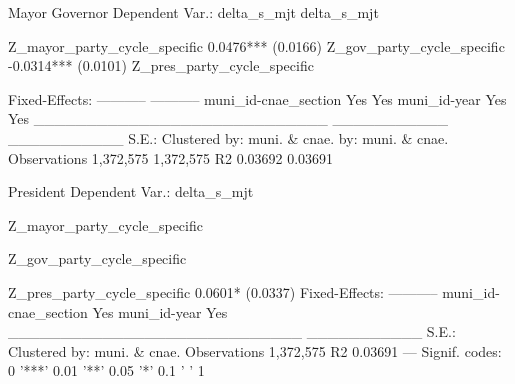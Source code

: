                                          Mayor          Governor
Dependent Var.:                    delta_s_mjt       delta_s_mjt
                                                                
Z_mayor_party_cycle_specific         0.0476***                  
                                    (0.0166)                    
Z_gov_party_cycle_specific                            -0.0314***
                                                      (0.0101)  
Z_pres_party_cycle_specific                                     
                                                                
Fixed-Effects:                     -----------       -----------
muni_id-cnae_section                       Yes               Yes
muni_id-year                               Yes               Yes
____________________________       ___________       ___________
S.E.: Clustered              by: muni. & cnae. by: muni. & cnae.
Observations                         1,372,575         1,372,575
R2                                     0.03692           0.03691

                                     President
Dependent Var.:                    delta_s_mjt
                                              
Z_mayor_party_cycle_specific                  
                                              
Z_gov_party_cycle_specific                    
                                              
Z_pres_party_cycle_specific            0.0601*
                                      (0.0337)
Fixed-Effects:                     -----------
muni_id-cnae_section                       Yes
muni_id-year                               Yes
____________________________       ___________
S.E.: Clustered              by: muni. & cnae.
Observations                         1,372,575
R2                                     0.03691
---
Signif. codes: 0 '***' 0.01 '**' 0.05 '*' 0.1 ' ' 1
